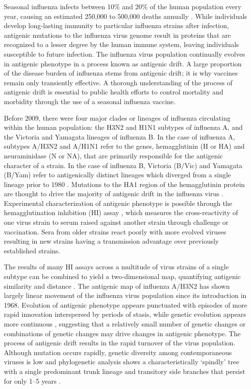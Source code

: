 \documentclass[11pt,oneside,letterpaper]{article}
\begin{document}
Seasonal influenza infects between 10\% and 20\% of the human population every year, causing an estimated 250,000 to 500,000 deaths annually \cite{flufactsheet}. 
While individuals develop long-lasting immunity to particular influenza strains after infection, antigenic mutations to the influenza virus genome result in proteins that are recognized to a lesser degree by the human immune system, leaving individuals susceptible to future infection. 
The influenza virus population continually evolves in antigenic phenotype in a process known as antigenic drift. 
A large proportion of the disease burden of influenza stems from antigenic drift; it is why vaccines remain only transiently effective. 
A thorough understanding of the process of antigenic drift is essential to public health efforts to control mortality and morbidity through the use of a seasonal influenza vaccine.

Before 2009, there were four major clades or lineages of influenza circulating within the human population: the H3N2 and H1N1 subtypes of influenza A, and the Victoria and Yamagata lineages of influenza B. 
In the case of influenza A, subtypes A/H3N2 and A/H1N1 refer to the genes, hemagglutinin (H or HA) and neuraminidase (N or NA), that are primarily responsible for the antigenic character of a strain. 
In the case of influenza B, Victoria (B/Vic) and Yamagata (B/Yam) refer to antigenically distinct lineages which diverged from a single lineage prior to 1980 \cite{Rota90}.
Mutations to the HA1 region of the hemagglutinin protein are thought to drive the majority of antigenic drift in the influenza virus \cite{Wiley81, Nelson07NatRevGenet}. 
Experimental characterization of antigenic phenotype is possible through the hemagglutination inhibition (HI) assay \cite{Hirst43}, which measures the cross-reactivity of one virus strain to serum raised against another strain through challenge or vaccination. 
Sera from older strains react poorly with more evolved viruses resulting in new strains having a transmission advantage over previously established strains.

The results of many HI assays across a multitude of virus strains of a single subtype can be combined to yield a two-dimensional map, quantifying antigenic similarity and distance \cite{Smith04}. 
The antigenic map of influenza A/H3N2 has shown largely linear movement of the influenza virus population since its introduction in 1968. 
Evolution of antigenic phenotype appears punctuated with episodes of more rapid innovation interspersed by periods of stasis, while genetic evolution appears more continuous \cite{Smith04}, suggesting that a relatively small number of genetic changes or combinations of genetic changes may drive changes in antigenic phenotype. 
The process of antigenic drift results in the rapid turnover of the virus population. 
Although mutation occurs rapidly, genetic diversity among contemporaneous viruses is low and phylogenetic analysis shows a characteristically `spindly' tree with a single predominant trunk lineage and transitory side branches that persist for only 1--5 years \cite{Fitch97}.
\end{document}
